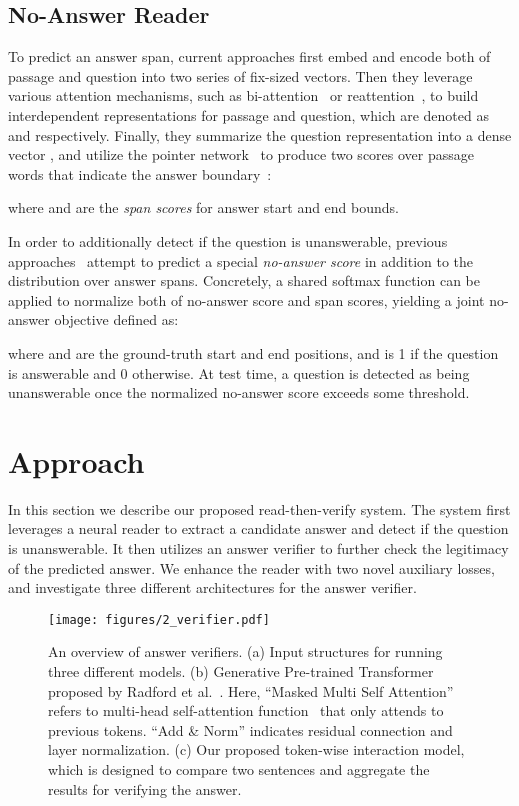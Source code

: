 \documentclass[letterpaper]{article} \usepackage{aaai19}  \usepackage{times}  \usepackage{helvet}  \usepackage{courier}  \usepackage{url}  \usepackage{graphicx}  \usepackage{pbox}
\begin{document}
\subsection{No-Answer Reader}
To predict an answer span, current approaches first embed and encode both of passage and question into two series of fix-sized vectors. Then they leverage various attention mechanisms, such as bi-attention~\cite{Seo17} or reattention~\cite{Hu17}, to build interdependent representations for passage and question, which are denoted as  and  respectively.
Finally, they summarize the question representation into a dense vector , and utilize the pointer network~\cite{Vinyals15} to produce two scores over passage words that indicate the answer boundary~\cite{Wang17b}:

where  and  are the \emph{span scores} for answer start and end bounds.

In order to additionally detect if the question is unanswerable, previous approaches~\cite{Levy17,Clark18,kundu2018nil} attempt to predict a special \emph{no-answer score}  in addition to the distribution over answer spans.
Concretely, a shared softmax function can be applied to normalize both of no-answer score and span scores, yielding a joint no-answer objective defined as:

where  and  are the ground-truth start and end positions, and  is 1 if the question is answerable and 0 otherwise.
At test time, a question is detected as being unanswerable once the normalized no-answer score exceeds some threshold.
 \section{Approach}
In this section we describe our proposed read-then-verify system. 
The system first leverages a neural reader to extract a candidate answer and detect if the question is unanswerable.
It then utilizes an answer verifier to further check the legitimacy of the predicted answer.
We enhance the reader with two novel auxiliary losses, and investigate three different architectures for the answer verifier.

\begin{figure*}
\begin{center}
\texttt{[image: figures/2\_verifier.pdf]}
\vspace{-0.1cm}
\caption{An overview of answer verifiers. 
(a) Input structures for running three different models.
(b) Generative Pre-trained Transformer proposed by Radford et al.~. Here, ``Masked Multi Self Attention'' refers to multi-head self-attention function~\cite{vaswani2017attention} that only attends to previous tokens. ``Add \& Norm'' indicates residual connection and layer normalization.
(c) Our proposed token-wise interaction model, which is designed to compare two sentences and aggregate the results for verifying the answer.
}
\label{fig2}
\vspace{-0.5cm}
\end{center}
\end{figure*}
\end{document}
